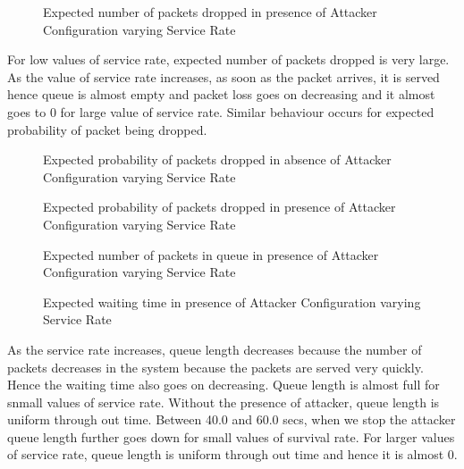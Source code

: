 \begin{figure}[H]
		\centering
		\caption{{Expected number of packets dropped in presence of Attacker Configuration varying Service Rate}}
		\label{fig:figca}
\end{figure}

\pagebreak

For low values of service rate, expected number of packets dropped is very large. As the value of service rate increases, as soon as the packet arrives, it is served hence queue is almost empty and packet loss goes on decreasing and it almost goes to 0 for large value of service rate. Similar behaviour occurs for expected probability of packet being dropped. 

\begin{figure}[H]
		\centering
		\caption{{Expected probability of packets dropped in absence of Attacker Configuration varying Service Rate}}
		\label{fig:figcb}
\end{figure}

\begin{figure}[H]
		\centering
		\caption{{Expected probability of packets dropped in presence of Attacker Configuration varying Service Rate}}
		\label{fig:figcc}
\end{figure}

\pagebreak

\begin{figure}[H]
		\centering
		\caption{{Expected number of packets in queue in presence of Attacker Configuration varying Service Rate}}
		\label{fig:figcd}
\end{figure}

\begin{figure}[H]
		\centering
		\caption{{Expected waiting time in presence of Attacker Configuration varying Service Rate}}
		\label{fig:figce}
\end{figure}

As the service rate increases, queue length decreases because the number of packets decreases in the system because the packets are served very quickly. Hence the waiting time also goes on decreasing. Queue length is almost full for snmall values of service rate. Without the presence of attacker, queue length is uniform through out time. Between 40.0 and 60.0 secs, when we stop the attacker queue length further goes down for small values of survival rate. For larger values of service rate, queue length is uniform through out time and hence it is almost 0.

